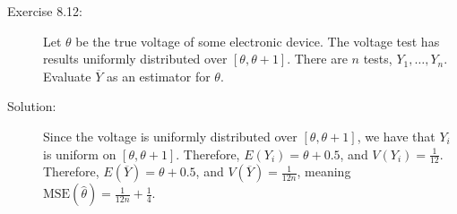 \documentclass[10pt]{extarticle}
\begin{document}
  \begin{description}
    \item[Exercise 8.12:] Let $\theta$ be the true voltage of some electronic device. The voltage test has results uniformly distributed over $[\theta,\theta + 1]$. There are $n$ tests, $Y_1,\dots,Y_n$. Evaluate $\overline{Y}$ as an estimator for $\theta$.
    \item[Solution:] Since the voltage is uniformly distributed over $[\theta,\theta + 1]$, we have that $Y_i$ is uniform on $[\theta,\theta + 1]$. Therefore, $E(Y_i) = \theta + 0.5$, and $V(Y_i) = \frac{1}{12}$.\\

      Therefore, $E(\overline{Y}) = \theta + 0.5$, and $V(\overline{Y}) = \frac{1}{12n}$, meaning $\text{MSE}(\hat{\theta}) = \frac{1}{12n} + \frac{1}{4}$.\\


\end{description}
\end{document}
